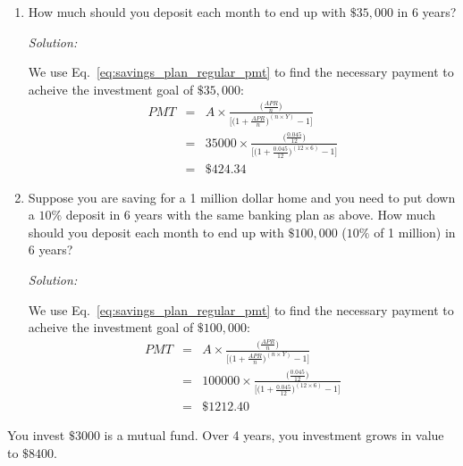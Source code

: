 \documentclass[12pt]{article}
\begin{document}
\begin{enumerate}
\item How much should you deposit each month to end up with $\$35,000$ in 6 years?

{\it Solution:

We use Eq.~\eqref{eq:savings_plan_regular_pmt} to find the necessary payment to acheive the investment goal of $\$35,000$:
\begin{eqnarray*}
	PMT &=& A \times \frac{\Big(\frac{APR}{n}\Big)}{\Big[\Big(1 + \frac{APR}{n}\Big)^{(n\times Y)} - 1\Big]} \\
	&=& 35000 \times \frac{\Big(\frac{0.045}{12}\Big)}{\Big[\Big(1 + \frac{0.045}{12}\Big)^{(12\times 6)} - 1\Big]} \\
	&=& \$424.34
\end{eqnarray*}
}
\item Suppose you are saving for a 1 million dollar home and you need to put down a $10\%$ deposit in 6 years with the same banking plan as above.  How much should you deposit each month to end up with $\$100,000$ ($10\%$ of 1 million) in 6 years?

{\it Solution:

We use Eq.~\eqref{eq:savings_plan_regular_pmt} to find the necessary payment to acheive the investment goal of $\$100,000$:
\begin{eqnarray*}
	PMT &=& A \times \frac{\Big(\frac{APR}{n}\Big)}{\Big[\Big(1 + \frac{APR}{n}\Big)^{(n\times Y)} - 1\Big]} \\
	&=& 100000 \times \frac{\Big(\frac{0.045}{12}\Big)}{\Big[\Big(1 + \frac{0.045}{12}\Big)^{(12\times 6)} - 1\Big]} \\
	&=& \$1212.40
\end{eqnarray*}
}
\end{enumerate}

You invest $\$3000$ is a mutual fund.  Over 4 years, you investment grows in value to $\$8400$.
\end{document}
